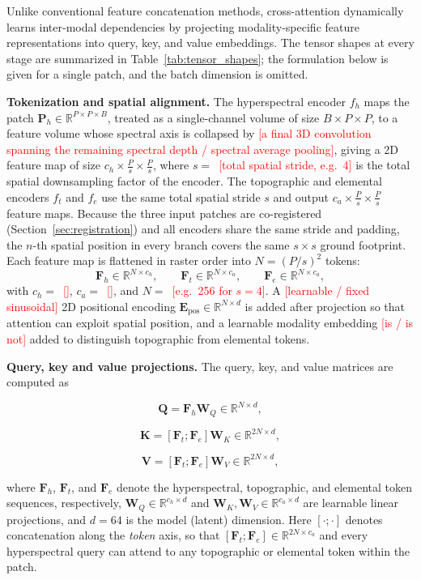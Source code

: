 \documentclass[pdflatex,sn-mathphys-num]{sn-jnl}
\newcommand{\fillin}[1]{\textcolor{red}{[#1]}}
\begin{document}
Unlike conventional feature concatenation methods, cross-attention dynamically learns inter-modal dependencies by projecting modality-specific feature representations into query, key, and value embeddings. The tensor shapes at every stage are summarized in Table~\ref{tab:tensor_shapes}; the formulation below is given for a single patch, and the batch dimension is omitted.

\textbf{Tokenization and spatial alignment.} The hyperspectral encoder $f_h$ maps the patch $\mathbf{P}_h\in\mathbb{R}^{P\times P\times B}$, treated as a single-channel volume of size $B\times P\times P$, to a feature volume whose spectral axis is collapsed by \fillin{a final 3D convolution spanning the remaining spectral depth / spectral average pooling}, giving a 2D feature map of size $c_h\times\frac{P}{s}\times\frac{P}{s}$, where $s=$~\fillin{total spatial stride, e.g.\ 4} is the total spatial downsampling factor of the encoder. The topographic and elemental encoders $f_t$ and $f_e$ use the same total spatial stride $s$ and output $c_a\times\frac{P}{s}\times\frac{P}{s}$ feature maps. Because the three input patches are co-registered (Section~\ref{sec:registration}) and all encoders share the same stride and padding, the $n$-th spatial position in every branch covers the same $s\times s$ ground footprint. Each feature map is flattened in raster order into $N=(P/s)^2$ tokens:
\[
\mathbf{F}_{h}\in\mathbb{R}^{N\times c_h},\qquad
\mathbf{F}_{t}\in\mathbb{R}^{N\times c_a},\qquad
\mathbf{F}_{e}\in\mathbb{R}^{N\times c_a},
\]
with $c_h=$~\fillin{}, $c_a=$~\fillin{}, and $N=$~\fillin{e.g.\ 256 for $s=4$}. A \fillin{learnable / fixed sinusoidal} 2D positional encoding $\mathbf{E}_{\mathrm{pos}}\in\mathbb{R}^{N\times d}$ is added after projection so that attention can exploit spatial position, and a learnable modality embedding \fillin{is / is not} added to distinguish topographic from elemental tokens.

\textbf{Query, key and value projections.} The query, key, and value matrices are computed as

\[
\mathbf{Q}=\mathbf{F}_{h}\mathbf{W}_{Q}\in\mathbb{R}^{N\times d},
\]

\[
\mathbf{K}=[\mathbf{F}_{t};\mathbf{F}_{e}]\mathbf{W}_{K}\in\mathbb{R}^{2N\times d},
\]

\[
\mathbf{V}=[\mathbf{F}_{t};\mathbf{F}_{e}]\mathbf{W}_{V}\in\mathbb{R}^{2N\times d},
\]

where $\mathbf{F}_{h}$, $\mathbf{F}_{t}$, and $\mathbf{F}_{e}$ denote the hyperspectral, topographic, and elemental token sequences, respectively, $\mathbf{W}_{Q}\in\mathbb{R}^{c_h\times d}$ and $\mathbf{W}_{K},\mathbf{W}_{V}\in\mathbb{R}^{c_a\times d}$ are learnable linear projections, and $d=64$ is the model (latent) dimension. Here $[\cdot;\cdot]$ denotes concatenation along the \emph{token} axis, so that $[\mathbf{F}_{t};\mathbf{F}_{e}]\in\mathbb{R}^{2N\times c_a}$ and every hyperspectral query can attend to any topographic or elemental token within the patch.
\end{document}
